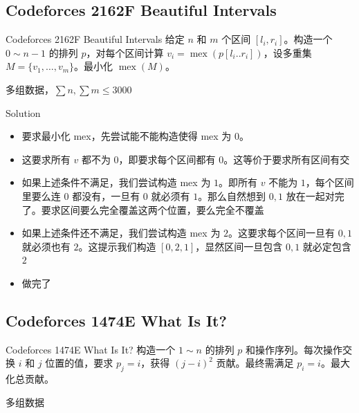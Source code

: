 ﻿\documentclass[aspectratio=169]{ctexbeamer}
\begin{document}
\subsection{Codeforces 2162F Beautiful Intervals}
\begin{frame}{Codeforces 2162F Beautiful Intervals}
    给定 $n$ 和 $m$ 个区间 $[l_i,r_i]$。构造一个 $0\sim n-1$ 的排列 $p$，对每个区间计算 $v_i=\operatorname{mex}(p[l_i..r_i])$，设多重集 $M=\{v_1,\dots,v_m\}$。最小化 $\operatorname{mex}(M)$。
    
    多组数据，$\sum n,\sum m\le 3000$
\end{frame}

\begin{frame}{Solution}
    \begin{itemize}
        \item 要求最小化 mex，先尝试能不能构造使得 mex 为 $ 0 $。
        \item 这要求所有 $v$ 都不为 $ 0 $，即要求每个区间都有 $ 0 $。这等价于要求所有区间有交
        \item 如果上述条件不满足，我们尝试构造 mex 为 $ 1 $。即所有 $ v $ 不能为 $ 1 $，每个区间里要么连 $ 0 $ 都没有，一旦有 $ 0 $ 就必须有 $ 1 $。那么自然想到 $ 0,1 $ 放在一起对完了。要求区间要么完全覆盖这两个位置，要么完全不覆盖
        \item 如果上述条件还不满足，我们尝试构造 mex 为 $ 2 $。这要求每个区间一旦有 $0,1$ 就必须也有 $2$。这提示我们构造 $[0,2,1]$，显然区间一旦包含 $0,1$ 就必定包含 $2$
        \item 做完了
    \end{itemize}
\end{frame}










\subsection{Codeforces 1474E What Is It?}
\begin{frame}{Codeforces 1474E What Is It?}
    构造一个 $1\sim n$ 的排列 $p$ 和操作序列。每次操作交换 $i$ 和 $j$ 位置的值，要求 $p_j=i$，获得 $(j-i)^2$ 贡献。最终需满足 $p_i=i$。最大化总贡献。
    
    多组数据
\end{frame}
\end{document}

